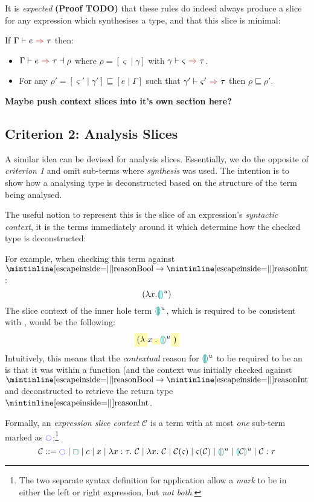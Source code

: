 It is \textit{expected} \textbf{(Proof TODO)} that these rules do indeed always produce a slice for any expression which synthesises a type, and that this slice is minimal:
\begin{conjecture}[Correctness]
\label{conj:SynthesisSliceUniqueness}
If $\synthesis{e}{\tau}$ then:
\begin{itemize}
\item $\synthesisslice{e}{\tau}{\rho}$ where $\rho = [\varsigma \mid \gamma]$ with $\synthesis[\gamma]{\varsigma}{\tau}$.
\item For any $\rho' = [\varsigma' \mid \gamma'] \sqsubseteq [e\mid \Gamma]$ such that $\synthesis[\gamma']{\varsigma'}{\tau}$ then $\rho \sqsubseteq \rho'$.
\end{itemize}
\end{conjecture}

\textbf{Maybe push context slices into it's own section here?}
\subsection{Criterion 2: Analysis Slices}\label{sec:AnalysisSlices}
A similar idea can be devised for analysis slices. Essentially, we do the opposite of \textit{criterion 1} and omit sub-terms where \textit{synthesis} was used. The intention is to show how a analysing type is deconstructed based on the structure of the term being analysed. 

The useful notion to represent this is the slice of an expression's \textit{syntactic context}, it is the terms immediately around it which determine how the checked type is deconstructed:

For example, when checking this term against $\code{Bool} \to \code{Int}$:
\[(\lambda x. {\color{teal}\llparenthesis}  {\color{teal}\rrparenthesis}^u)\]
The slice context of the inner hole term ${\color{teal}\llparenthesis}  {\color{teal}\rrparenthesis}^u$, which is required to be consistent with , would be the following:
\[\hlcmaths[yellow!30]{(\lambda} x\hlcmaths[yellow!30]{.} \hole^u \hlcmaths[yellow!30]{)}\]
Intuitively, this means that the \textit{contextual} reason for ${\color{teal}\llparenthesis}  {\color{teal}\rrparenthesis}^u$ to be required to be an  is that it was within a function (and the context was initially checked against $\code{Bool} \to \code{Int}$ and deconstructed to retrieve the return type $\code{Int}$.

\newcommand{\C}{\mathcal{C}}
Formally, an \textit{expression slice context} $\mathcal{C}$ is a term with at most \textit{one} sub-term marked as $\mark$:\footnote{The two separate syntax definition for application allow a \textit{mark} to be in either the left or right expression, but \textit{not both}.}
\[\C ::=  \mark \mid \gap \mid c \mid x \mid \lambda x : \tau.\ \C \mid \lambda x.\ \C \mid \C(\varsigma) \mid \varsigma(\C) \mid \hole^u \mid \hole[\C]^u \mid \C : \tau\]

